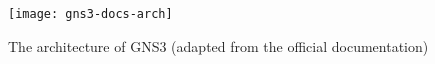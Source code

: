 \begin{figure}
  \centering
  \texttt{[image: gns3-docs-arch]}
  \caption{The architecture of GNS3 (adapted from the official documentation)}
  \label{fig:gns3-docs-arch}
\end{figure}
